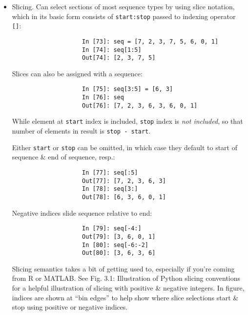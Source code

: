 \documentclass{article}
\begin{document}
\begin{itemize}
\begin{itemize}
\begin{itemize}
\begin{itemize}
				\begin{verbatim}
					In [70]: b = ["saw", "small", "He", "foxes", "six"]
					In [71]: b.sort(key=len)
					In [72]: b
					Out[72]: ['He', 'saw', 'six', 'small', 'foxes']
				\end{verbatim}
				{\tt sorted} function can produce a sorted copy of a general sequence.
				\item {\sf Slicing.} Can select sections of most sequence types by using slice notation, which in its basic form consists of {\tt start:stop} passed to indexing operator {\tt[]}:
				\begin{verbatim}
					In [73]: seq = [7, 2, 3, 7, 5, 6, 0, 1]
					In [74]: seq[1:5]
					Out[74]: [2, 3, 7, 5]
				\end{verbatim}
				Slices can also be assigned with a sequence:
				\begin{verbatim}
					In [75]: seq[3:5] = [6, 3]
					In [76]: seq
					Out[76]: [7, 2, 3, 6, 3, 6, 0, 1]
				\end{verbatim}
				While element at {\tt start} index is included, {\tt stop} index is {\it not included}, so that number of elements in result is {\tt stop - start}.
				
				Either {\tt start} or {\tt stop} can be omitted, in which case they default to start of sequence \& end of sequence, resp.:
				\begin{verbatim}
					In [77]: seq[:5]
					Out[77]: [7, 2, 3, 6, 3]
					In [78]: seq[3:]
					Out[78]: [6, 3, 6, 0, 1]
				\end{verbatim}
				Negative indices slide sequence relative to end:
				\begin{verbatim}
					In [79]: seq[-4:]
					Out[79]: [3, 6, 0, 1]
					In [80]: seq[-6:-2]
					Out[80]: [3, 6, 3, 6]
				\end{verbatim}
				Slicing semantics takes a bit of getting used to, especially if you're coming from R or MATLAB. See {\sf Fig. 3.1: Illustration of Python slicing conventions} for a helpful illustration of slicing with positive \& negative integers. In figure, indices are shown at ``bin edges'' to help show where slice selections start \& stop using positive or negative indices.
				

\end{itemize}
\end{itemize}
\end{itemize}
\end{itemize}
\end{document}
